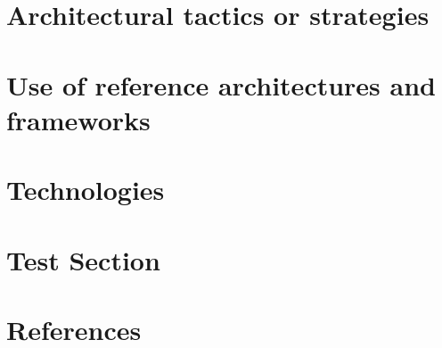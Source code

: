 \documentclass[11pt,a4paper,titlepage]{article}
\begin{document}
	

\section{Architectural tactics or strategies}

	

\section{Use of reference architectures and frameworks}

	
	

\section {Technologies}



\section{Test Section}



\section{References}


\end{document}
